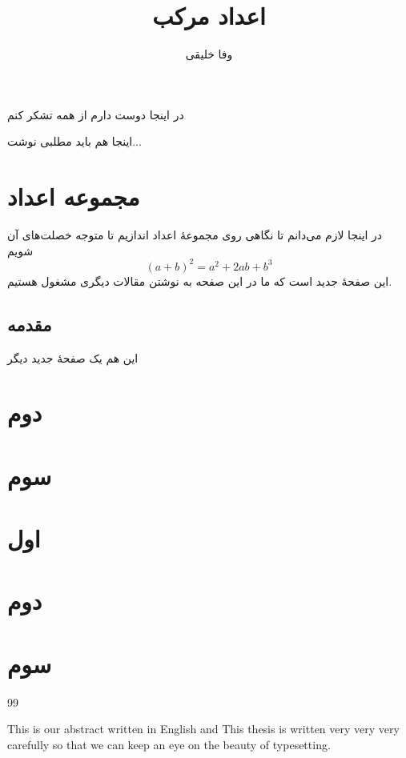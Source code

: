 \documentclass[a4paper,11pt]{xepersian-thesis}
\begin{document}
\title{اعداد مرکب}
\author{وفا خلیقی}
\thesisdate{\today}
\maketitle
\begin{acknowledgementpage}
در اینجا دوست دارم از همه تشکر کنم
\end{acknowledgementpage}
\begin{abstractpage}
اینجا هم باید مطلبی نوشت...
\end{abstractpage}
\tableofcontents
\listoftables
\chapter{مجموعه اعداد}
در اینجا لازم می‌دانم تا نگاهی روی مجموعهٔ اعداد اندازیم تا متوجه خصلت‌های آن شویم
\begin{equation}
(a+b)^2=a^2+2ab+b^3
\end{equation}
\newpage
این صفحهٔ جدید است که ما در این صفحه به نوشتن مقالات دیگری مشغول هستیم.
\section{مقدمه}

\newpage
این هم یک صفحهٔ جدید دیگر
\chapter{دوم}
\chapter{سوم}
\appendix
\chapter{اول}
\chapter{دوم}
\chapter{سوم}

\begin{thebibliography}{99}
\end{thebibliography}
\begin{latin}
\latinthesisdate{\latintoday}
\begin{latinabstract}
\noindent This is our abstract written in English and This thesis is written very very very carefully so that we can keep  an eye on the beauty of typesetting.
\end{latinabstract}
\makelatintitle
\end{latin}
\end{document}
